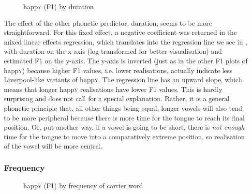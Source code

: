 	\begin{figure}
		
		\resizebox{0.5\linewidth}{!}{}
		\caption{happ\textsc{y} (F1) by duration}
		\label{fig.scatter.f1w.happy.dur}
	\end{figure}

The effect of the other phonetic predictor, duration, seems to be more straightforward.
For this fixed effect, a negative coefficient was returned in the mixed linear effects regression, which translates into the regression line we see in , with duration on the x-axis (log-transformed for better visualisation) and estimated F1 on the y-axis.
The y-axis is inverted (just as in the other F1 plots of happ\textsc{y}) because higher F1 values, i.e. lower realisations, actually indicate less Liverpool-like variants of happ\textsc{y}.
The regression line has an upward slope, which means that longer happ\textsc{y} realisations have lower F1 values.
This is hardly surprising and does not call for a special explanation.
Rather, it is a general phonetic principle that, all other things being equal, longer vowels will also tend to be more peripheral because there is more time for the tongue to reach its final position.
Or, put another way, if a vowel is going to be short, there is \emph{not enough} time for the tongue to move into a comparatively extreme position, so realisation of the vowel will be more central.

			\subsubsection{Frequency}
			\label{sec.prod.res.vow.happy.f1.zipf}

	\begin{figure}
		
		\resizebox{0.5\linewidth}{!}{}
		\caption{happ\textsc{y} (F1) by frequency of carrier word}
		\label{fig.scatter.f1w.happy.zipf}
	\end{figure}

